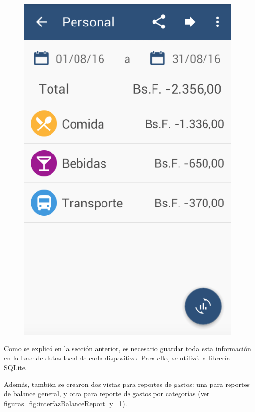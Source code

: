 \begin{figure}[ht]
\begin{minipage}{.5\textwidth}
  \includegraphics[scale=0.45,type=png,ext=.png,read=.png]{imagenes/categories_report}
  \captionsetup{justification=centering}
  \label{fig:interfazCategoriesReport}
\end{minipage}
\end{figure}

Como se explicó en la sección anterior, es necesario guardar toda esta información en la base de datos local de cada dispositivo. Para ello, se utilizó la librería SQLite.

Además, también se crearon dos vistas para reportes de gastos: una para reportes de balance general, y otra para reporte de gastos por categorías (ver figuras~\ref{fig:interfazBalanceReport} y ~\ref{fig:interfazCategoriesReport}).

